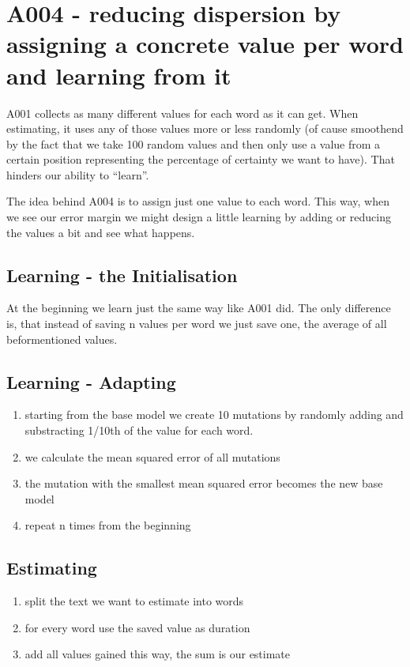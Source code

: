 \newpage{}

\section{A004 - reducing dispersion by assigning a concrete value per
word and learning from
it}

A001 collects as many different values for each word as it can get. 
When estimating, it uses any of those values more or less randomly (of cause
smoothend by the fact that we take 100 random values and then only use a
value from a certain position representing the percentage of certainty
we want to have). 
That hinders our ability to ``learn''.

The idea behind A004 is to assign just one value to each word.
This way, when we see our error margin we might design a little learning by adding or reducing the values a bit and see what happens.

\subsection{Learning - the Initialisation}

At the beginning we learn just the same way like A001 did.
The only difference is, that instead of saving n values per word we just save one, the average of all beformentioned values. 

\subsection{Learning - Adapting}

\begin{enumerate}
        \tightlist
        \item starting from the base model we create 10 mutations by randomly adding and substracting 1/10th of the value for each word.
        \item we calculate the mean squared error of all mutations
        \item the mutation with the smallest mean squared error becomes the new base model
        \item repeat n times from the beginning
\end{enumerate}

\subsection{Estimating}

\begin{enumerate}
        \tightlist
        \item split the text we want to estimate into words
        \item for every word use the saved value as duration
        \item add all values gained this way, the sum is our estimate
\end{enumerate}


